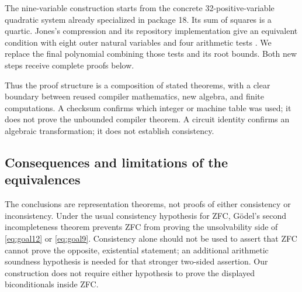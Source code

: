 The nine-variable construction starts from the concrete 32-positive-variable
quadratic system already specialized in package 18. Its sum of squares is
a quartic. Jones's compression and its repository implementation give an
equivalent condition with eight outer natural variables and four arithmetic
tests \cite{jones,p18,ninemain}. We replace the final polynomial combining
those tests and its root bounds. Both new steps receive complete proofs
below.

Thus the proof structure is a composition of stated theorems, with a clear
boundary between reused compiler mathematics, new algebra, and finite
computations. A checksum confirms which integer or machine table was used;
it does not prove the unbounded compiler theorem. A circuit identity confirms
an algebraic transformation; it does not establish consistency.

\subsection{Consequences and limitations of the equivalences}
The conclusions are representation theorems, not proofs of either consistency
or inconsistency. Under the usual consistency hypothesis for ZFC, G\"odel's
second incompleteness theorem prevents ZFC from proving the unsolvability
side of \eqref{eq:goal12} or \eqref{eq:goal9}. Consistency alone should not be
used to assert that ZFC cannot prove the opposite, existential statement;
an additional arithmetic soundness hypothesis is needed for that stronger
two-sided assertion. Our construction does not require either hypothesis
to prove the displayed biconditionals inside ZFC.
